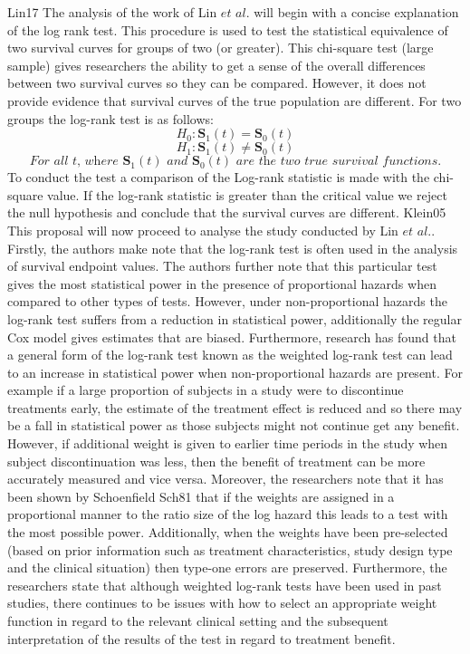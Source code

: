\documentclass[12pt,twoside]{reedthesis}
\begin{document}
Lin17
The analysis of the work of Lin \(\textit{et al.}\) will begin with a concise explanation of the log rank test. This procedure is used to test the statistical equivalence of two survival curves for groups of two (or greater). This chi-square test (large sample) gives researchers the ability to get a sense of the overall differences between two survival curves so they can be compared. However, it does not provide evidence that survival curves of the true population are different. For two groups the log-rank test is as follows:
\[H_{0} : \mathbf{S}_{1}(t) = \mathbf{S}_{0}(t)\]
\[H_{1} :  \mathbf{S}_{1}(t) \neq \mathbf{S}_{0}(t)\]
\[\textit{For all t, where $\mathbf{S}_{1}(t)$ and $\mathbf{S}_{0}(t)$ are the two true survival functions.}\]
To conduct the test a comparison of the Log-rank statistic is made with the chi-square value. If the log-rank statistic is greater than the critical value we reject the null hypothesis and conclude that the survival curves are different.
Klein05
This proposal will now proceed to analyse the study conducted by Lin \(\textit{et al.}\). Firstly, the authors make note that the log-rank test is often used in the analysis of survival endpoint values. The authors further note that this particular test gives the most statistical power in the presence of proportional hazards when compared to other types of tests. However, under non-proportional hazards the log-rank test suffers from a reduction in statistical power, additionally the regular Cox model gives estimates that are biased. Furthermore, research has found that a general form of the log-rank test known as the weighted log-rank test can lead to an increase in statistical power when non-proportional hazards are present. For example if a large proportion of subjects in a study were to discontinue treatments early, the estimate of the treatment effect is reduced and so there may be a fall in statistical power as those subjects might not continue get any benefit. However, if additional weight is given to earlier time periods in the study when subject discontinuation was less, then the benefit of treatment can be more accurately measured and vice versa. Moreover, the researchers note that it has been shown by Schoenfield Sch81 that if the weights are assigned in a proportional manner to the ratio size of the log hazard this leads to a test with the most possible power. Additionally, when the weights have been pre-selected (based on prior information such as treatment characteristics, study design type and the clinical situation) then type-one errors are preserved. Furthermore, the researchers state that although weighted log-rank tests have been used in past studies, there continues to be issues with how to select an appropriate weight function in regard to the relevant clinical setting and the subsequent interpretation of the results of the test in regard to treatment benefit.
\end{document}
